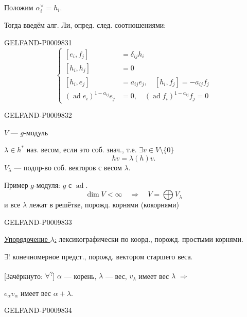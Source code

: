 Положим $\alpha_i^{\vee}=h_i$.

Тогда введём алг. Ли, опред. след. соотношениями:


\begin{GelfandAdjacentEvidence}{GELFAND-P000983}{1}
\[
\tag{*}
\left\{
\begin{aligned}
[e_i,f_j]&=\delta_{ij}h_i\\
[h_i,h_j]&=0\\
[h_i,e_j]&=a_{ij}e_j,\quad [h_i,f_j]=-a_{ij}f_j\\
(\operatorname{ad}e_i)^{1-a_{ij}}e_j&=0,\quad
(\operatorname{ad}f_i)^{1-a_{ij}}f_j=0
\end{aligned}
\right.
\]
\end{GelfandAdjacentEvidence}
\begin{GelfandAdjacentEvidence}{GELFAND-P000983}{2}


$V$ --- $g$-модуль

$\lambda\in h^*$ наз. весом, если это соб. знач., т.е. $\exists v\in V\setminus\{0\}$
\[
hv=\lambda(h)v.
\]
$V_\lambda$ --- подпр-во соб. векторов с весом $\lambda$.

Пример $g$-модуля: $g$ с $\operatorname{ad}$.
\[
\dim V<\infty\quad\Rightarrow\quad V=\bigoplus V_\lambda
\]
и все $\lambda$ лежат в решётке, порожд. корнями (кокорнями)
\end{GelfandAdjacentEvidence}
\begin{GelfandAdjacentEvidence}{GELFAND-P000983}{3}


\underline{Упорядочение $\lambda$:} лексикографически по коорд., порожд. простыми корнями.

$\exists!$ конечномерное предст., порожд. вектором старшего веса.

[Зачёркнуто: $\forall$\textsuperscript{?}] $\alpha$ --- корень, $\lambda$ --- вес, $v_\lambda$ имеет вес $\lambda$ $\Rightarrow$

$e_\alpha v_\alpha$ имеет вес $\alpha+\lambda$.
\end{GelfandAdjacentEvidence}
\begin{GelfandAdjacentEvidence}{GELFAND-P000983}{4}

\end{GelfandAdjacentEvidence}
